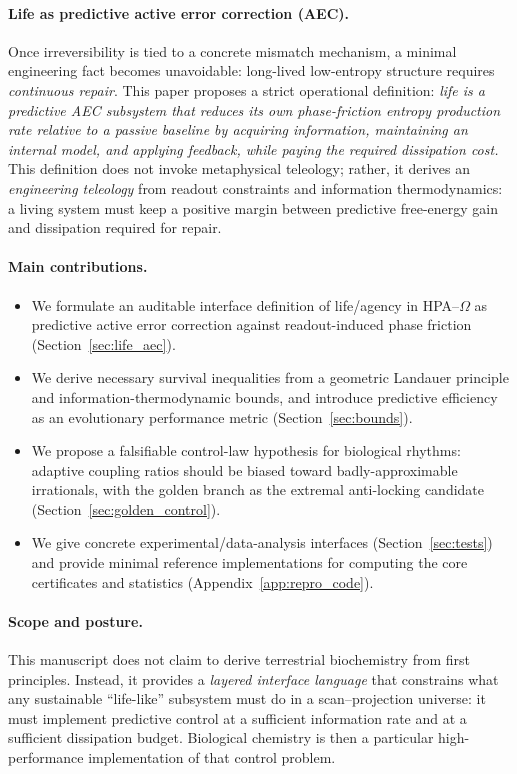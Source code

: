 \paragraph{Life as predictive active error correction (AEC).}
Once irreversibility is tied to a concrete mismatch mechanism, a minimal engineering fact becomes unavoidable: long-lived low-entropy structure requires \emph{continuous repair}.
This paper proposes a strict operational definition:
\emph{life is a predictive AEC subsystem that reduces its own phase-friction entropy production rate relative to a passive baseline by acquiring information, maintaining an internal model, and applying feedback, while paying the required dissipation cost.}
This definition does not invoke metaphysical teleology; rather, it derives an \emph{engineering teleology} from readout constraints and information thermodynamics: a living system must keep a positive margin between predictive free-energy gain and dissipation required for repair.

\paragraph{Main contributions.}
\begin{itemize}
  \item We formulate an auditable interface definition of life/agency in HPA--$\Omega$ as predictive active error correction against readout-induced phase friction (Section~\ref{sec:life_aec}).
  \item We derive necessary survival inequalities from a geometric Landauer principle and information-thermodynamic bounds, and introduce predictive efficiency as an evolutionary performance metric (Section~\ref{sec:bounds}).
  \item We propose a falsifiable control-law hypothesis for biological rhythms: adaptive coupling ratios should be biased toward badly-approximable irrationals, with the golden branch as the extremal anti-locking candidate (Section~\ref{sec:golden_control}).
  \item We give concrete experimental/data-analysis interfaces (Section~\ref{sec:tests}) and provide minimal reference implementations for computing the core certificates and statistics (Appendix~\ref{app:repro_code}).
\end{itemize}

\paragraph{Scope and posture.}
This manuscript does not claim to derive terrestrial biochemistry from first principles.
Instead, it provides a \emph{layered interface language} that constrains what any sustainable ``life-like'' subsystem must do in a scan--projection universe: it must implement predictive control at a sufficient information rate and at a sufficient dissipation budget.
Biological chemistry is then a particular high-performance implementation of that control problem.


